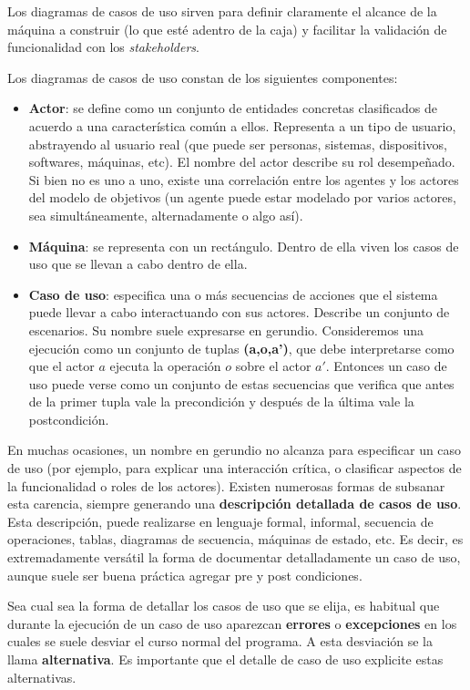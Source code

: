 \documentclass[]{article}
\begin{document}
Los diagramas de casos de uso sirven para definir claramente el alcance de la máquina a construir (lo que esté adentro de la caja) y facilitar la validación de funcionalidad con los \textit{stakeholders}.

Los diagramas de casos de uso constan de los siguientes	componentes:
\begin{itemize}
	\item \textbf{Actor}: se define como un conjunto de entidades concretas clasificados de acuerdo a una característica común a ellos. Representa a un tipo de usuario, abstrayendo al usuario real (que puede ser personas, sistemas, dispositivos, softwares, máquinas, etc). El nombre del actor describe su rol desempeñado. Si bien no es uno a uno, existe una correlación entre los agentes y los actores del modelo de objetivos (un agente puede estar modelado por varios actores, sea simultáneamente, alternadamente o algo así).
	\item \textbf{Máquina}: se representa con un rectángulo. Dentro de ella viven los casos de uso que se llevan a cabo dentro de ella.
	\item \textbf{Caso de uso}: especifica una o más secuencias de acciones que el sistema puede llevar a cabo interactuando con sus actores. Describe un conjunto de escenarios. Su nombre suele expresarse en gerundio. Consideremos una ejecución como un conjunto de tuplas \textbf{(a,o,a')}, que debe interpretarse como que el actor $a$ ejecuta la operación $o$ sobre el actor $a'$. Entonces un caso de uso puede verse como un conjunto de estas secuencias que verifica que antes de la primer tupla vale la precondición y después de la última vale la postcondición.
\end{itemize}

En muchas ocasiones, un nombre en gerundio no alcanza para especificar un caso de uso (por ejemplo, para explicar una interacción crítica, o clasificar aspectos de la funcionalidad o roles de los actores). Existen numerosas formas de subsanar esta carencia, siempre generando una \textbf{descripción detallada de casos de uso}. Esta descripción, puede realizarse en lenguaje formal, informal, secuencia de operaciones, tablas, diagramas de secuencia, máquinas de estado, etc. Es decir, es extremadamente versátil la forma de documentar detalladamente un caso de uso, aunque suele ser buena práctica agregar pre y post condiciones.

Sea cual sea la forma de detallar los casos de uso que se elija, es habitual que durante la ejecución de un caso de uso aparezcan \textbf{errores} o \textbf{excepciones} en los cuales se suele desviar el curso normal del programa. A esta desviación se la llama \textbf{alternativa}. Es importante que el detalle de caso de uso explicite estas alternativas.
\end{document}
